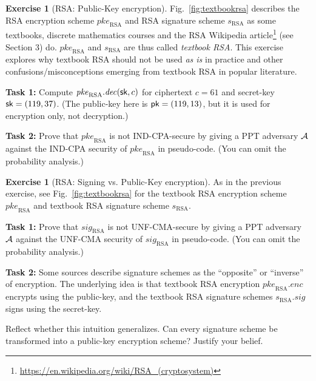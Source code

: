 \documentclass[envcountsame,runningheads,notitlepage]{../llncs}
\theoremstyle{definition}
\newtheorem{graded}[crossed]{Exercise}
\newcommand{\V}[1]{\ensuremath{\mathit{#1}}}
\newcommand{\StyleModel}[1]{\V{{#1}}}
\newcommand{\pke}{\StyleModel{pke}}
\renewcommand{\enc}{\StyleModel{enc}}
\renewcommand{\dec}{\StyleModel{dec}}
\renewcommand{\sig}{\StyleModel{sig}}
\begin{document}
\begin{graded}[RSA: Public-Key encryption]
Fig.~\ref{fig:textbookrsa} describes the RSA encryption scheme $\pke_\text{RSA}$ and RSA signature scheme $s_\text{RSA}$ as some textbooks, discrete mathematics courses and the RSA Wikipedia article\footnote{\url{https://en.wikipedia.org/wiki/RSA_(cryptosystem)}} (see Section 3) do. $\pke_\text{RSA}$ and $s_\text{RSA}$ are thus called \emph{textbook RSA}. This exercise explores
why textbook RSA should not be used \emph{as is} in practice and other confusions/misconceptions emerging from textbook RSA
in popular literature.

\medskip
\noindent
\textbf{Task 1:}
Compute $\pke_\text{RSA}.\dec(\sk,c)$ for ciphertext $c=61$ and secret-key $\sk=(119,37)$.
(The public-key here is $\pk=(119,13)$, but it is used for encryption only, not decryption.)

\medskip
\noindent
\textbf{Task 2:}
Prove that $\pke_\text{RSA}$ is not IND-CPA-secure by giving a PPT adversary $\mathcal{A}$ against
the IND-CPA security of $\pke_\text{RSA}$ in pseudo-code. (You can omit the probability analysis.)
\end{graded}



\begin{graded}[RSA: Signing vs. Public-Key encryption]
As in the previous exercise, see Fig.~\ref{fig:textbookrsa} for the textbook RSA encryption scheme $\pke_\text{RSA}$ and textbook RSA signature scheme $s_\text{RSA}$.

\textbf{Task 1:}
Prove that $\sig_\text{RSA}$ is not UNF-CMA-secure by giving a PPT adversary $\mathcal{A}$ against
the UNF-CMA security of $\sig_\text{RSA}$ in pseudo-code. (You can omit the probability analysis.)

\medskip
\noindent
\textbf{Task 2:} Some sources describe signature schemes as the ``opposite'' or ``inverse'' of
		encryption. The underlying idea is that textbook RSA encryption $\pke_\text{RSA}.\enc$ encrypts using the public-key, and the
		textbook RSA signature schemes $s_\text{RSA}.\sig$
		signs using the secret-key.
		
		Reflect whether this intuition generalizes. Can every signature scheme
		be transformed into a public-key encryption scheme? Justify your belief.
	\end{graded}
		
\end{document}

